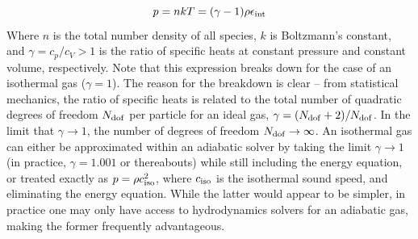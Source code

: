 \documentclass[notoc]{tufte-handout}
\begin{document}
\begin {equation}
p =  n k T = (\gamma - 1) \rho \epsilon_{\rm int}
\label{eqn:ideal_gas}
\end {equation}
%
Where $n$ is the total number density of all species, $k$ is Boltzmann's constant, and $\gamma = c_p / c_V > 1$ is the ratio of specific heats at constant pressure and constant volume, respectively. Note that this expression breaks down for the case of an isothermal gas ($\gamma = 1$). The reason for the breakdown is clear -- from statistical mechanics, the ratio of specific heats is related to the total number of quadratic degrees of freedom $N_{\rm dof}$ per particle for an ideal gas, $\gamma = (N_{\rm dof} + 2) / N_{\rm dof}$. In the limit that $\gamma \rightarrow 1$, the number of degrees of freedom $N_{\rm dof} \rightarrow \infty$. An isothermal gas can either be approximated within an adiabatic solver by taking the limit $\gamma \rightarrow 1$ (in practice, $\gamma = 1.001$ or thereabouts) while still including the energy equation, or treated exactly as $p = \rho c_{\rm iso}^2$, where $c_{\rm iso}$ is the isothermal sound speed, and eliminating the energy equation. While the latter would appear to be simpler, in practice one may only have access to hydrodynamics solvers for an adiabatic gas, making the former frequently advantageous.
\end{document}
